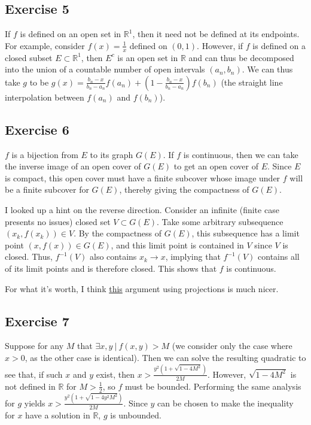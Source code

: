 \subsection{Exercise 5}
If $f$ is defined on an open set in $\mathbb{R}^1$, then it need not be defined at its endpoints.
For example, consider $f(x) = \frac{1}{x}$ defined on $(0, 1)$. However, if $f$ is defined on a
closed subset $E \subset \mathbb{R}^1$, then $E^c$ is an open set in $\mathbb{R}$ and can thus be
decomposed into the union of a countable number of open intervals $(a_n, b_n)$. We can thus take
$g$ to be $g(x) = \frac{b_n - x}{b_n - a_n} f(a_n) + (1 - \frac{b_n - x}{b_n - a_n}) f(b_n)$ 
(the straight line interpolation between $f(a_n)$ and $f(b_n)$).

\subsection{Exercise 6}
$f$ is a bijection from $E$ to its graph $G(E)$. If $f$ is continuous, then we can take the inverse image of
an open cover of $G(E)$ to get an open cover of $E$. Since $E$ is compact, this open cover must have a
finite subcover whose image under $f$ will be a finite subcover for $G(E)$, thereby giving the compactness of
$G(E)$.

I looked up a hint on the reverse direction. Consider an infinite (finite case presents no issues) closed set 
$V \subset G(E)$. Take some arbitrary subsequence $(x_k, f(x_k)) \in V$. 
By the compactness of $G(E)$, this subsequence has a limit point $(x, f(x)) \in G(E)$, and this limit point is
contained in $V$ since $V$ is closed. Thus, $f^{-1} (V)$ also contains $x_k \to x$, implying that $f^{-1} (V)$ 
contains all of its limit points and is therefore closed. This shows that $f$ is continuous.

For what it's worth, I think 
\href{http://at.yorku.ca/cgi-bin/bbqa?forum=ask_an_analyst_2005&task=show_msg&msg=3485.0001.0001.0001}{this}
argument using projections is much nicer.

\subsection{Exercise 7}
Suppose for any $M$ that $\exists x, y \: | \: f(x, y) > M$ (we consider only the case where $x > 0$, as the
other case is identical). Then we can solve the resulting quadratic to see that, if such $x$ and $y$ exist,
then $x > \frac{y^2 (1 + \sqrt{1 - 4M^2})}{2M}$. However, $\sqrt{1 - 4M^2}$ is not defined in $\mathbb{R}$
for $M > \frac{1}{2}$, so $f$ must be bounded. Performing the same analysis for $g$ yields 
$x > \frac{y^2 (1 + \sqrt{1 - 4y^2M^2})}{2M}$. Since $y$ can be chosen to make the inequality for $x$ have
a solution in $\mathbb{R}$, $g$ is unbounded.

